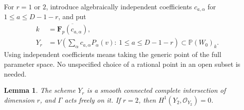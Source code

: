 \documentclass[11pt]{article}
\newcommand{\Fp}{\mathbf F_p}\newcommand{\OO}{\mathcal O}
\newtheorem{lemma}[theorem]{Lemma}\newtheorem{proposition}[theorem]{Proposition}
\theoremstyle{definition}\newtheorem{definition}[theorem]{Definition}
\theoremstyle{remark}\newtheorem{remark}[theorem]{Remark}
\begin{document}
For $r=1$ or $2$, introduce algebraically independent coefficients $c_{a,\alpha}$ for $1\leq a\leq D-1-r$, and put
\begin{align}
 k&=\overline{\Fp(c_{a,\alpha})},\nonumber\\
 Y_r&=V\left(\sum_\alpha c_{a,\alpha}P_\alpha(v) :\
                  1\leq a\leq D-1-r\right)
                   \subset\mathbb P(W_0)_k.\label{eq:Y}
\end{align}
Using independent coefficients means taking the generic point of the full parameter space. No unspecified choice of a rational point in an open subset is needed.

\begin{lemma}\label{lem:free}
The scheme $Y_r$ is a smooth connected complete intersection of dimension $r$, and $\Gamma$ acts freely on it. If $r=2$, then $H^1(Y_2,\OO_{Y_2})=0$.
\end{lemma}
\end{document}

